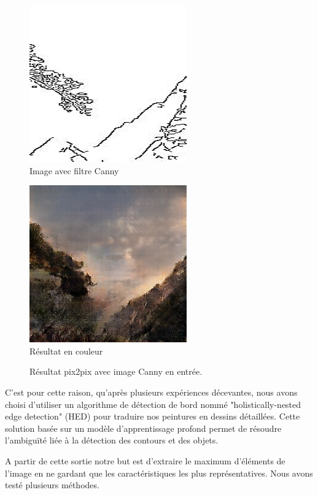 \documentclass[a4paper, 12pt]{report}
\begin{document}
\begin{figure}[!h]
\centering 
\begin{minipage}{0.45\textwidth}
\centering
\includegraphics[scale=0.5]{images/roro-1_real_A.png}
\\Image avec filtre Canny
\\
\end{minipage}
\begin{minipage}{0.45\textwidth}
\centering
\includegraphics[scale=0.5]{images/roro-1_fake_B.png}
\\Résultat en couleur
\end{minipage}
\caption{\centering Résultat pix2pix avec image Canny en entrée.}
\label{pix2pix-canny-color}
\end{figure}
\newpage
C'est pour cette raison, qu'après plusieurs expériences décevantes, nous avons choisi d'utiliser un algorithme de détection de bord nommé "holistically-nested edge detection" (HED) pour traduire nos peintures en dessins détaillées. Cette solution basée sur un modèle d'apprentissage profond permet de résoudre l’ambiguïté liée à la détection des contours et des objets.

A partir de cette sortie notre but est d'extraire le maximum d’éléments de l'image en ne gardant que les caractéristiques les plus représentatives. Nous avons testé plusieurs méthodes.
\end{document}
